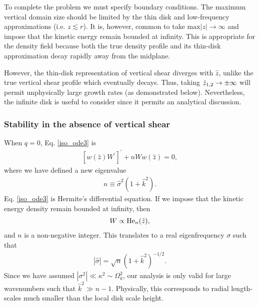 To complete the problem we must specify boundary conditions. The 
maximum vertical domain size should be limited by the thin
disk and low-frequency approximations (i.e. $z\lesssim r$).     
It is, however, common to take $\mathrm{max}|z|\to\infty$ and impose
that the kinetic  energy remain bounded at infinity. This 
is appropriate for the density field because both the true density profile 
and its thin-disk approximation decay rapidly away from the midplane.   

However, the thin-disk representation of vertical shear diverges with 
$\hat{z}$, unlike the true vertical shear profile which eventually
decays.  Thus, taking $\hat{z}_{1,2}\to \pm\infty$ will permit unphysically large growth
rates (as demonstrated below). Nevertheless, the infinite disk is
useful to consider since it permits an analytical discussion. 

\subsubsection{Stability in the absence of vertical shear}
When $q=0$, Eq. \ref{iso_ode3} is
\begin{align}\label{hermite_ode}
  \left[w(\hat{z})W^\prime \right]^\prime + nW
  w(\hat{z}) =0, 
\end{align}
where we have defined a new eigenvalue
\begin{align}
  n \equiv \hat{\sigma}^2(1+\hat{k}^2). 
\end{align} 
Eq. \ref{iso_ode3} is Hermite's differential equation. If we impose
that the kinetic energy density remain bounded at infinity, then  
\begin{align}
  W \propto \operatorname{He}_n(\hat{z}),
\end{align}
and $n$ is a non-negative integer. This translates to a real
eigenfrequency $\sigma$ such that
\begin{align}
  \left|\hat{\sigma}\right| = \sqrt{n}
  \left(1+\hat{k}^2\right)^{-1/2}. 
\end{align}
Since we have assumed $|\sigma^2|\ll \kappa^2\sim \Omega_k^2$, our
analysis is only valid for large wavenumbers such that $\hat{k}^2\gg   
n-1$. Physically, this corresponds to radial length-scales much
smaller than the local disk scale height. 

